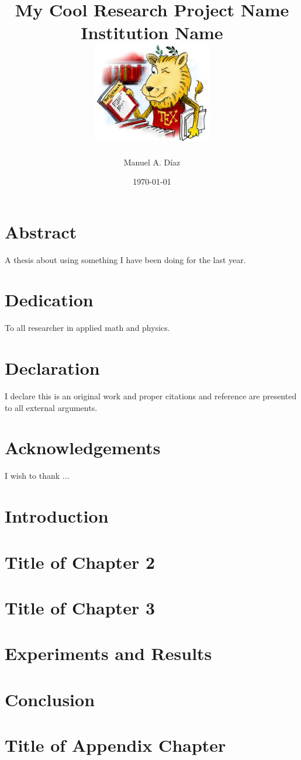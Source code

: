 \documentclass[12pt,twoside]{report} %
\title{
    {My Cool Research Project Name}\\
    {\large Institution Name}\\
    \vspace{1cm}
    {\includegraphics{TeXlion}}
}
\author{Manuel A. D\'iaz}
\date{\today}
\begin{document}
    \maketitle

    \chapter*{Abstract}
    A thesis about using something I have been doing for the last year.

    \chapter*{Dedication}
    To all researcher in applied math and physics.

    \chapter*{Declaration}
    I declare this is an original work and proper citations and reference are presented to all external arguments.

    \chapter*{Acknowledgements}
    I wish to thank ... 

    \tableofcontents

    \chapter{Introduction}
    

    \chapter{Title of Chapter 2}
    

    \chapter{Title of Chapter 3}
    

    \chapter{Experiments and Results}
    

    \chapter{Conclusion}
    

    \printbibliography

    \appendix
    \chapter{Title of Appendix Chapter}
    

\end{document}
